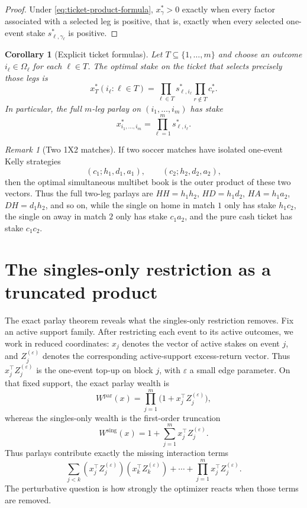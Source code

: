 \documentclass[11pt]{article}
\numberwithin{equation}{section}
\newtheorem{corollary}[theorem]{Corollary}
\theoremstyle{remark}
\newtheorem{remark}[theorem]{Remark}
\theoremstyle{definition}
\newcommand{\1}{\mathbf{1}}
\newcommand{\eps}{\varepsilon}
\newcommand{\parlay}{\mathrm{par}}
\newcommand{\sing}{\mathrm{sing}}
\begin{document}
\begin{proof}
Under \eqref{eq:ticket-product-formula}, $x_\gamma^*>0$ exactly when every factor associated with a selected leg is positive, that is, exactly when every selected one-event stake $s_{\ell,\gamma_\ell}^*$ is positive.
\end{proof}

\begin{corollary}[Explicit ticket formulas]
\label{cor:explicit-tickets}
Let $T\subseteq\{1,\dots,m\}$ and choose an outcome $i_\ell\in\Omega_\ell$ for each $\ell\in T$. The optimal stake on the ticket that selects precisely those legs is
\begin{equation}
  x_T^*(i_\ell:\ell\in T)
  = \prod_{\ell\in T} s_{\ell,i_\ell}^* \prod_{r\notin T} c_r^*.
  \label{eq:general-ticket}
\end{equation}
In particular, the full $m$-leg parlay on $(i_1,\dots,i_m)$ has stake
\begin{equation}
  x_{i_1,\dots,i_m}^* = \prod_{\ell=1}^m s_{\ell,i_\ell}^*.
  \label{eq:full-ticket}
\end{equation}
\end{corollary}

\begin{remark}[Two 1X2 matches]
If two soccer matches have isolated one-event Kelly strategies
\[
  (c_1;h_1,d_1,a_1),\qquad (c_2;h_2,d_2,a_2),
\]
then the optimal simultaneous multibet book is the outer product of these two vectors. Thus the full two-leg parlays are $HH=h_1h_2$, $HD=h_1d_2$, $HA=h_1a_2$, $DH=d_1h_2$, and so on, while the single on home in match $1$ only has stake $h_1c_2$, the single on away in match $2$ only has stake $c_1a_2$, and the pure cash ticket has stake $c_1c_2$.
\end{remark}

\section{The singles-only restriction as a truncated product}
The exact parlay theorem reveals what the singles-only restriction removes. Fix an active support family. After restricting each event to its active outcomes, we work in reduced coordinates: $x_j$ denotes the vector of active stakes on event $j$, and $Z_j^{(\eps)}$ denotes the corresponding active-support excess-return vector. Thus $x_j^\top Z_j^{(\eps)}$ is the one-event top-up on block $j$, with $\eps$ a small edge parameter. On that fixed support, the exact parlay wealth is
\begin{equation}
  W^\parlay(x)=\prod_{j=1}^m \bigl(1+x_j^\top Z_j^{(\eps)}\bigr),
  \label{eq:Wpar}
\end{equation}
whereas the singles-only wealth is the first-order truncation
\begin{equation}
  W^\sing(x)=1+\sum_{j=1}^m x_j^\top Z_j^{(\eps)}.
  \label{eq:Wsing}
\end{equation}
Thus parlays contribute exactly the missing interaction terms
\[
  \sum_{j<k} (x_j^\top Z_j^{(\eps)})(x_k^\top Z_k^{(\eps)})
  + \cdots + \prod_{j=1}^m x_j^\top Z_j^{(\eps)}.
\]
The perturbative question is how strongly the optimizer reacts when those terms are removed.
\end{document}
